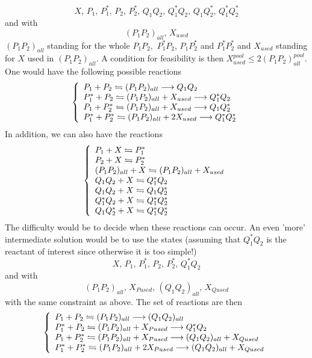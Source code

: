 $$
  X,\,P_1,\,P_1^*,\,P_2,\,P_2^*,\,Q_1Q_2,\,Q_1^*Q_2,\,Q_1Q_2^*,\,Q_1^*Q_2^*
$$
and with
$$
  (P_1P_2)_{all},\, X_{used}
$$
$(P_1P_2)_{all}$ standing for the whole $P_1P_2,$ $P_1^*P_2$, $P_1P_2^*$ and $P_1^*P_2^*$ and $X_{used}$ standing for $X$ used in $(P_1P_2)_{all}$. A condition for feasibility is then $X_{used}^{pool} \leq 2 (P_1P_2)_{all}^{pool}$. One would have the following possible reactions
$$
  \left\{
    \begin{array}{l}
      P_1+P_2 \stackrel{}{\leftrightharpoons} (P_1P_2)_{all} \longrightarrow Q_1Q_2 \\
      P_1^*+P_2 \stackrel{}{\leftrightharpoons} (P_1P_2)_{all}+X_{used} \longrightarrow Q_1^*Q_2 \\
      P_1+P_2^* \stackrel{}{\leftrightharpoons} (P_1P_2)_{all}+X_{used} \longrightarrow Q_1Q_2^* \\
      P_1^*+P_2^* \stackrel{}{\leftrightharpoons} (P_1P_2)_{all}+2 X_{used} \longrightarrow Q_1^*Q_2^* \\
    \end{array}
  \right.
$$
In addition, we can also have the reactions
$$
  \left\{
    \begin{array}{l}
      P_1 + X \stackrel{}{\leftrightharpoons} P_1^* \\
      P_2 + X \stackrel{}{\leftrightharpoons} P_2^* \\
      (P_1P_2)_{all} + X \stackrel{}{\leftrightharpoons} (P_1P_2)_{all} + X_{used} \\
      Q_1Q_2 + X \stackrel{}{\leftrightharpoons} Q_1^*Q_2 \\
      Q_1Q_2 + X \stackrel{}{\leftrightharpoons} Q_1Q_2^* \\
      Q_1^*Q_2 + X \stackrel{}{\leftrightharpoons} Q_1^*Q_2^* \\
      Q_1Q_2^* + X \stackrel{}{\leftrightharpoons} Q_1^*Q_2^* \\
    \end{array}
  \right.
$$
The difficulty would be to decide when these reactions can occur. An even 'more' intermediate solution would be to use the states (assuming that $Q_1^*Q_2$ is the reactant of interest since otherwise it is too simple!)
$$
  X,\,P_1,\,P_1^*,\,P_2,\,P_2^*,\,Q_1^*Q_2
$$
and with
$$
  (P_1P_2)_{all},\, X_{Pused},\,(Q_1Q_2)_{all},\, X_{Qused}
$$
with the same constraint as above. The set of reactions are then
$$
  \left\{
    \begin{array}{l}
      P_1+P_2 \stackrel{}{\leftrightharpoons} (P_1P_2)_{all} \longrightarrow (Q_1Q_2)_{all} \\
      P_1^*+P_2 \stackrel{}{\leftrightharpoons} (P_1P_2)_{all}+X_{Pused} \longrightarrow Q_1^*Q_2 \\
      P_1+P_2^* \stackrel{}{\leftrightharpoons} (P_1P_2)_{all}+X_{Pused} \longrightarrow (Q_1Q_2)_{all}+X_{Qused} \\
      P_1^*+P_2^* \stackrel{}{\leftrightharpoons} (P_1P_2)_{all}+2 X_{Pused} \longrightarrow (Q_1Q_2)_{all}+X_{Qused} \\
    \end{array}
  \right.
$$
